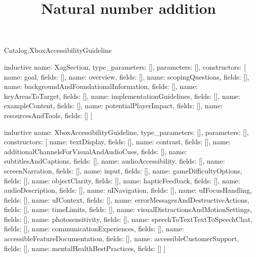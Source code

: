 \begin{lexlean}{Catalog.XboxAccessibilityGuideline}
\title{Natural number addition}
\begin{semanticmodule}
inductive{
  name: XagSection,
  type_parameters: [],
  parameters: [],
  constructors: [
    {name: goal, fields: []},
    {name: overview, fields: []},
    {name: scopingQuestions, fields: []},
    {name: backgroundAndFoundationalInformation, fields: []},
    {name: keyAreasToTarget, fields: []},
    {name: implementationGuidelines, fields: []},
    {name: exampleContent, fields: []},
    {name: potentialPlayerImpact, fields: []},
    {name: resourcesAndTools, fields: []}
  ]
}

inductive{
  name: XboxAccessibilityGuideline,
  type_parameters: [],
  parameters: [],
  constructors: [
    {name: textDisplay, fields: []},
    {name: contrast, fields: []},
    {name: additionalChannelsForVisualAndAudioCues, fields: []},
    {name: subtitlesAndCaptions, fields: []},
    {name: audioAccessibility, fields: []},
    {name: screenNarration, fields: []},
    {name: input, fields: []},
    {name: gameDifficultyOptions, fields: []},
    {name: objectClarity, fields: []},
    {name: hapticFeedback, fields: []},
    {name: audioDescription, fields: []},
    {name: uINavigation, fields: []},
    {name: uIFocusHandling, fields: []},
    {name: uIContext, fields: []},
    {name: errorMessagesAndDestructiveActions, fields: []},
    {name: timeLimits, fields: []},
    {name: visualDistractionsAndMotionSettings, fields: []},
    {name: photosensitivity, fields: []},
    {name: speechToTextTextToSpeechChat, fields: []},
    {name: communicationExperiences, fields: []},
    {name: accessibleFeatureDocumentation, fields: []},
    {name: accessibleCustomerSupport, fields: []},
    {name: mentalHealthBestPractices, fields: []}
  ]
}
\end{semanticmodule}
\end{lexlean}
